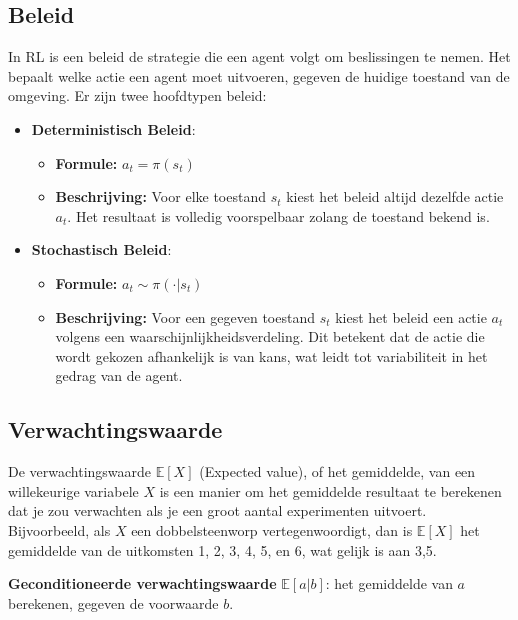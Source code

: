 \documentclass[a4paper,12pt]{report}
\begin{document}
\subsection*{Beleid}

In RL is een beleid de strategie die een agent volgt om beslissingen te nemen.
Het bepaalt welke actie een agent moet uitvoeren, gegeven de huidige toestand
van de omgeving. Er zijn twee hoofdtypen beleid:

\begin{itemize}
    \item \textbf{Deterministisch Beleid}:
          \begin{itemize}
              \item \textbf{Formule:} \(a_t = \pi(s_t)\)
              \item \textbf{Beschrijving:} Voor elke toestand \(s_t\) kiest het beleid altijd dezelfde actie \(a_t\). Het resultaat is volledig voorspelbaar zolang de toestand bekend is.
          \end{itemize}

    \item \textbf{Stochastisch Beleid}:
          \begin{itemize}
              \item \textbf{Formule:} \(a_t \sim \pi(\cdot|s_t)\)
              \item \textbf{Beschrijving:} Voor een gegeven toestand \(s_t\) kiest het beleid een actie \(a_t\) volgens een waarschijnlijkheidsverdeling. Dit betekent dat de actie die wordt gekozen afhankelijk is van kans, wat leidt tot variabiliteit in het gedrag van de agent.
          \end{itemize}
\end{itemize}

\subsection*{Verwachtingswaarde}

De verwachtingswaarde \(\mathbb{E}[X]\) (Expected value), of het gemiddelde,
van een willekeurige variabele \(X\) is een manier om het gemiddelde resultaat
te berekenen dat je zou verwachten als je een groot aantal experimenten
uitvoert. Bijvoorbeeld, als \(X\) een dobbelsteenworp vertegenwoordigt, dan is
\(\mathbb{E}[X]\) het gemiddelde van de uitkomsten 1, 2, 3, 4, 5, en 6, wat
gelijk is aan 3,5.

\textbf{Geconditioneerde verwachtingswaarde} \(\mathbb{E}[a|b]\): het gemiddelde van \(a\) berekenen, gegeven de voorwaarde \(b\).
\end{document}
